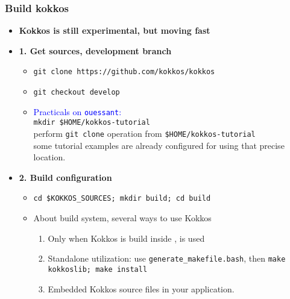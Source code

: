 \begin{frame}
  \frametitle{Build kokkos}

  \begin{itemize}
  \item \textbf{Kokkos is still experimental, but moving fast}
  \item \textbf{1. Get sources, development branch}
    \begin{itemize}
    \item \texttt{git clone https://github.com/kokkos/kokkos}
    \item \texttt{git checkout develop}
    \item \textcolor{blue}{Practicals on \texttt{ouessant}:}\\
      \texttt{mkdir \$HOME/kokkos-tutorial}\\
      perform \texttt{git clone} operation from \texttt{\$HOME/kokkos-tutorial}\\
      some tutorial examples are already configured for using that precise location.
    \end{itemize}
  \item \textbf{2. Build configuration}
    \begin{itemize}
    \item \texttt{cd \$KOKKOS\_SOURCES; mkdir build; cd build}
    \item About build system, several ways to use Kokkos
      \begin{enumerate}
      \item Only when Kokkos is build inside ,  is used
      \item Standalone utilization: use \texttt{generate\_makefile.bash}, then \texttt{make kokkoslib; make install}
      \item Embedded Kokkos source files in your application.
      \end{enumerate}
    \end{itemize}
  \end{itemize}
 
\end{frame}

